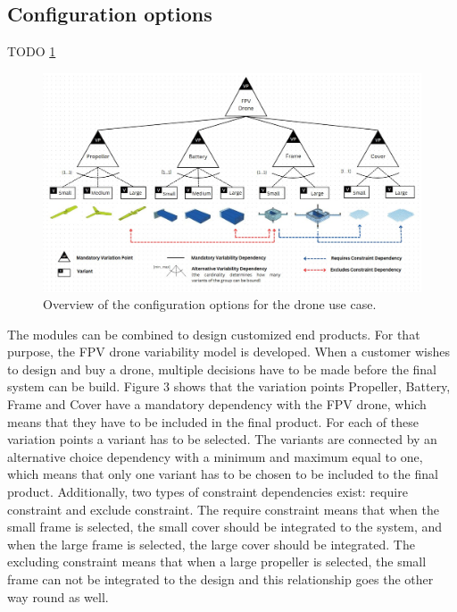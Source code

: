 \documentclass[sigconf,review]{acmart}
\begin{document}
\subsection{Configuration options}
\label{sec:configuration-options}

TODO \cref{fig:feature-tree}

\begin{figure}[htbp]
    \includegraphics[width=\textwidth]{./FeatureTreeWithLegend3.jpg}
    \caption{Overview of the configuration options for the drone use case.}
    \label{fig:feature-tree}
\end{figure}

The modules can be combined to design customized end products.  For that purpose, the FPV drone variability model is developed. 
When a customer wishes to design and buy a drone, multiple decisions have to be made before the final system can be build. 
Figure 3 shows that the variation points Propeller, Battery, Frame and Cover have a mandatory dependency with the FPV drone, which means that they have to be included in the final product. 
For each of these variation points a variant has to be selected. The variants are connected by an alternative choice dependency with a minimum and maximum equal to one, which means that only one variant has to be chosen to be included to the final product. 
Additionally, two types of constraint dependencies exist: require constraint and exclude constraint. The require constraint means that when the small frame is selected, the small cover should be integrated to the system, and when the large frame is selected, the large cover should be integrated. 
The excluding constraint means that when a large propeller is selected, the small frame can not be integrated to the design and this relationship goes the other way round as well.
\end{document}
